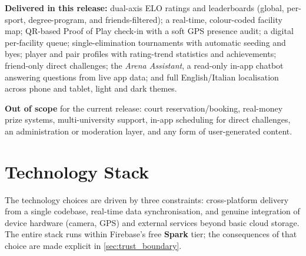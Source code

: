 \documentclass{configurations/polimi3i_thesis}
\renewcommand{\_}{\textunderscore\allowbreak}
\begin{document}
\textbf{Delivered in this release:} dual-axis ELO ratings and leaderboards (global, per-sport, degree-program, and friends-filtered); a real-time, colour-coded facility map; QR-based Proof of Play check-in with a soft GPS presence audit; a digital per-facility queue; single-elimination tournaments with automatic seeding and byes; player and pair profiles with rating-trend statistics and achievements; friend-only direct challenges; the \textit{Arena Assistant}, a read-only in-app chatbot answering questions from live app data; and full English/Italian localisation across phone and tablet, light and dark themes.

\textbf{Out of scope} for the current release: court reservation/booking, real-money prize systems, multi-university support, in-app scheduling for direct challenges, an administration or moderation layer, and any form of user-generated content.

\section{Technology Stack}
\label{sec:technology_stack}

The technology choices are driven by three constraints: cross-platform delivery from a single codebase, real-time data synchronisation, and genuine integration of device hardware (camera, GPS) and external services beyond basic cloud storage. The entire stack runs within Firebase's free \textbf{Spark} tier; the consequences of that choice are made explicit in \cref{sec:trust_boundary}.
\end{document}
